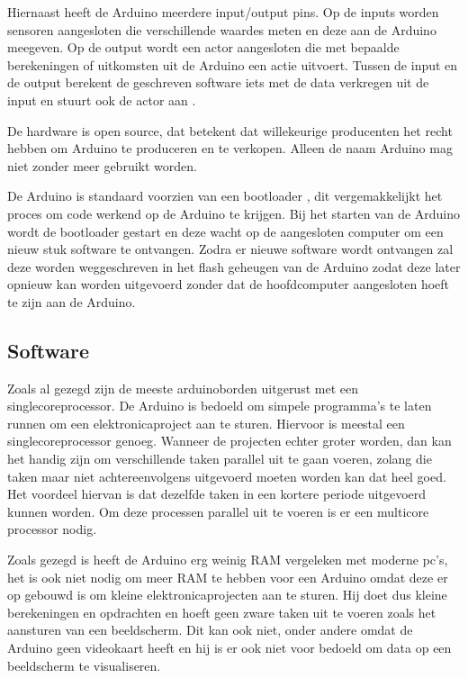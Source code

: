 \documentclass[a4paper, dutch, abstract=true]{scrartcl}
\begin{document}
Hiernaast heeft de Arduino meerdere input/output pins.
Op de inputs worden sensoren aangesloten die verschillende waardes meten en deze aan de Arduino
meegeven.
Op de output wordt een actor aangesloten die met bepaalde berekeningen of uitkomsten uit de Arduino
een actie uitvoert.
Tussen de input en de output berekent de geschreven software iets met de data verkregen uit de input
en stuurt ook de actor aan \cite{arduinoreference}.

De hardware is open source, dat betekent dat willekeurige producenten het recht hebben om Arduino te
produceren en te verkopen.
Alleen de naam Arduino mag niet zonder meer gebruikt worden.

De Arduino is standaard voorzien van een bootloader \cite{optiboot2019github}, dit vergemakkelijkt
het proces om code werkend op de Arduino te krijgen.
Bij het starten van de Arduino wordt de bootloader gestart en deze wacht op de aangesloten computer
om een nieuw stuk software te ontvangen.
Zodra er nieuwe software wordt ontvangen zal deze worden weggeschreven in het flash geheugen van de
Arduino zodat deze later opnieuw kan worden uitgevoerd zonder dat de hoofdcomputer aangesloten hoeft
te zijn aan de Arduino.

\subsection{Software}
Zoals al gezegd zijn de meeste arduinoborden uitgerust met een singlecoreprocessor.
De Arduino is bedoeld om simpele programma's te laten runnen om een elektronicaproject aan te
sturen.
Hiervoor is meestal een singlecoreprocessor genoeg.
Wanneer de projecten echter groter worden, dan kan het handig zijn om verschillende taken parallel
uit te gaan voeren, zolang die taken maar niet achtereenvolgens uitgevoerd moeten worden kan dat
heel goed.
Het voordeel hiervan is dat dezelfde taken in een kortere periode uitgevoerd kunnen worden.
Om deze processen parallel uit te voeren is er een multicore processor nodig.

Zoals gezegd is heeft de Arduino erg weinig RAM vergeleken met moderne pc's, het is ook niet nodig
om meer RAM te hebben voor een Arduino omdat deze er op gebouwd is om kleine elektronicaprojecten
aan te sturen.
Hij doet dus kleine berekeningen en opdrachten en hoeft geen zware taken uit te voeren zoals het
aansturen van een beeldscherm.
Dit kan ook niet, onder andere omdat de Arduino geen videokaart heeft en hij is er ook niet voor
bedoeld om data op een beeldscherm te visualiseren.
\end{document}
